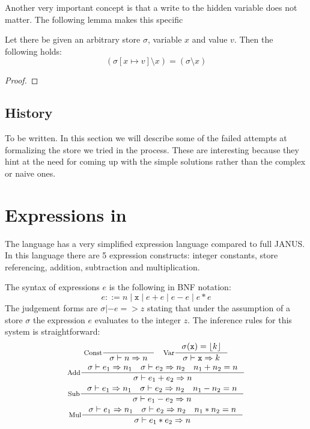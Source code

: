Another very important concept is that a write to the hidden variable
does not matter. The following lemma makes this specific
\begin{lem}
  Let there be given an arbitrary store $\sigma$, variable $x$ and value
  $v$. Then the following holds:
  \begin{equation*}
    (\sigma[x \mapsto v] \setminus x) = (\sigma \setminus x)
  \end{equation*}
\end{lem}
\begin{proof}
  
\end{proof}

\subsection{History}

To be written. In this section we will describe some of the failed
attempts at formalizing the store we tried in the process. These are
interesting because they hint at the need for coming up with the
simple solutions rather than the complex or naive ones.


\section{Expressions in \janusz{}}

The \janusz{} language has a very simplified expression language
compared to full JANUS. In this language there are 5 expression
constructs: integer constants, store referencing, addition,
subtraction and multiplication.

The syntax of expressions $e$ is the following in BNF notation:
\newcommand{\bor}{\; | \;}
\begin{equation*}
  e ::= n \bor \mathtt{x} \bor e + e \bor e - e \bor e * e
\end{equation*}
The judgement forms are $\sigma |- e => z$ stating that under the
assumption of a store $\sigma$ the expression $e$ evaluates to the
integer $z$. The inference rules for this system is straightforward:
\begin{gather*}
  \inference[Const]{}{\sigma |- n => n} \quad \inference[Var]{\sigma(\mathtt{x}) =
    \lift{k}}{\sigma |- \mathtt{x} => k} \\
  \inference[Add]{\sigma |- e_1 => n_1 \quad \sigma |- e_2 => n_2 \quad
    n_1 + n_2 = n}{\sigma |- e_1 + e_2 => n} \\
  \inference[Sub]{\sigma |- e_1 => n_1 \quad \sigma |- e_2 => n_2 \quad
    n_1 - n_2 = n}{\sigma |- e_1 - e_2 => n} \\
  \inference[Mul]{\sigma |- e_1 => n_1 \quad \sigma |- e_2 => n_2 \quad
    n_1 * n_2 = n}{\sigma |- e_1 * e_2 => n}
\end{gather*}

